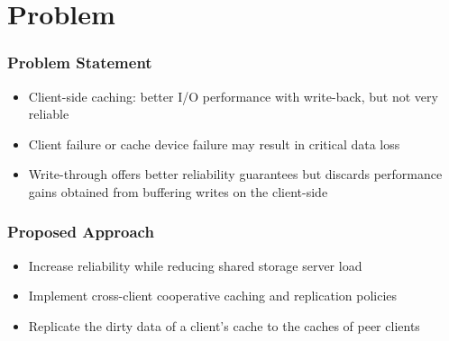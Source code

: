 \section{Problem}
%
\begin{frame}
    \frametitle{Problem Statement}
    \begin{itemize}
	\item Client-side caching: better I/O performance with
	    write-back, but not very reliable
	\item Client failure or cache device failure may result in
	    critical data loss
	\item Write-through offers better reliability guarantees
	    but discards performance gains obtained from buffering
	    writes on the client-side
    \end{itemize}
\end{frame}
\begin{frame}
    \frametitle{Proposed Approach}
    \begin{itemize}
	\item Increase reliability while reducing shared storage
	    server load
	\item Implement cross-client cooperative caching and
	    replication policies
	\item Replicate the dirty data of a client's cache
	    to the caches of peer clients
    \end{itemize}
\end{frame}
